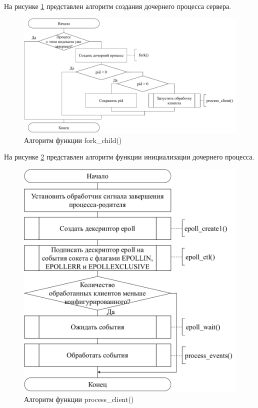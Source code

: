 На рисунке \ref{scheme-fork-child} представлен алгоритм создания дочернего процесса сервера.

\begin{figure}[H]
	\centering
	\includegraphics[scale=0.6]{img/fork_child.pdf}
	\caption{Алгоритм функции fork\_child()}
	\label{scheme-fork-child}
\end{figure}

На рисунке \ref{scheme-process-client} представлен алгоритм функции инициализации дочернего процесса.

\begin{figure}[H]
	\centering
	\includegraphics[scale=0.5]{img/process_client.pdf}
	\caption{Алгоритм функции process\_client()}
	\label{scheme-process-client}
\end{figure}

